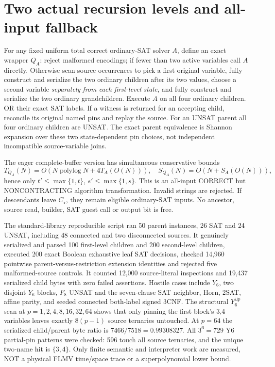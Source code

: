 \documentclass[11pt]{article}
\begin{document}
\section{Two actual recursion levels and all-input fallback}
For any fixed uniform total correct ordinary-SAT
solver $A$, define an exact wrapper $Q_A$:
reject malformed encodings; if fewer than two
active variables call $A$ directly. Otherwise
scan source occurrences to pick a first original
variable, fully construct and serialize the two
ordinary children after its two values, choose a
second variable \emph{separately from each
first-level state}, and fully construct and
serialize the two ordinary grandchildren.
Execute $A$ on all four ordinary children.
OR their exact SAT labels. If a witness is
returned for an accepting child, reconcile its
original named pins and replay the source.
For an UNSAT parent all four ordinary children
are UNSAT. The exact parent equivalence is
Shannon expansion over these two state-dependent
pin choices, not independent incompatible
source-variable joins.

The eager complete-buffer version has simultaneous
conservative bounds
\[
 T_{Q_A}(N)=O(N\operatorname{polylog}N+4T_A(O(N))),
 \quad
 S_{Q_A}(N)=O(N+S_A(O(N))),
\]
hence only
$t'\le\max\{1,t\}$,
$s'\le\max\{1,s\}$.
This is an all-input CORRECT but NONCONTRACTING
algorithm transformation. Invalid strings are rejected.
If descendants leave $C_\star$, they remain
eligible ordinary-SAT inputs. No ancestor, source
read, builder, SAT guest call or output bit is free.

The standard-library reproducible script ran
50 parent instances, 26 SAT and 24 UNSAT,
including 48 connected and two disconnected
sources. It genuinely serialized and parsed
100 first-level children and 200 second-level
children, executed 200 exact Boolean exhaustive
leaf SAT decisions, checked 14,960 pointwise
parent-versus-restriction extension identities
and rejected five malformed-source controls.
It counted 12,000 source-literal inspections
and 19,437 serialized child bytes with zero
failed assertions. Hostile cases include
$Y_6$, two disjoint $Y_6$ blocks,
$F_8$ UNSAT and the seven-clause SAT neighbor,
Horn, 2SAT, affine parity, and seeded
connected both-label signed 3CNF.
The structural $Y_6^{\sqcup p}$ scan at
$p=1,2,4,8,16,32,64$ shows that only pinning
the first block's 3,4 variables leaves
exactly $8(p-1)$ source ternaries untouched.
At $p=64$ the serialized child/parent byte
ratio is $7466/7518=0.99308327$.
All $3^6=729$ Y6 partial-pin patterns were
checked: 596 touch all source ternaries,
and the unique two-name hit is $\{3,4\}$.
Only finite semantic and interpreter work
are measured, NOT a physical FLMV time/space
trace or a superpolynomial lower bound.
\end{document}
